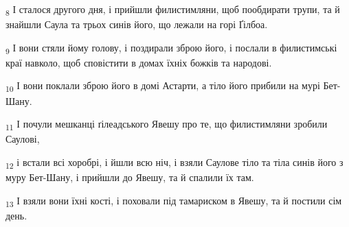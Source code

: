 \begin{tcolorbox}
\textsubscript{8} І сталося другого дня, і прийшли филистимляни, щоб пообдирати трупи, та й знайшли Саула та трьох синів його, що лежали на горі Ґілбоа.
\end{tcolorbox}
\begin{tcolorbox}
\textsubscript{9} І вони стяли йому голову, і поздирали зброю його, і послали в филистимські краї навколо, щоб сповістити в домах їхніх божків та народові.
\end{tcolorbox}
\begin{tcolorbox}
\textsubscript{10} І вони поклали зброю його в домі Астарти, а тіло його прибили на мурі Бет-Шану.
\end{tcolorbox}
\begin{tcolorbox}
\textsubscript{11} І почули мешканці ґілеадського Явешу про те, що филистимляни зробили Саулові,
\end{tcolorbox}
\begin{tcolorbox}
\textsubscript{12} і встали всі хоробрі, і йшли всю ніч, і взяли Саулове тіло та тіла синів його з муру Бет-Шану, і прийшли до Явешу, та й спалили їх там.
\end{tcolorbox}
\begin{tcolorbox}
\textsubscript{13} І взяли вони їхні кості, і поховали під тамариском в Явешу, та й постили сім день.
\end{tcolorbox}

